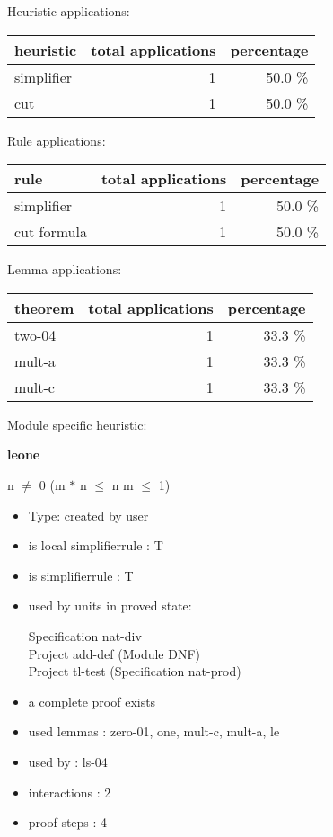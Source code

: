 \documentclass[a4paper]{article}
\begin{document}
\medskip


Heuristic applications:

\begin{supertabular}{l|r|r}
heuristic	& total applications & percentage \\ \hline
simplifier & 1 & 50.0 \% \\
cut & 1 & 50.0 \% \\

\end{supertabular}

Rule applications:

\begin{supertabular}{l|r|r}
rule	        & total applications & percentage \\ \hline
simplifier & 1 & 50.0 \% \\
cut formula & 1 & 50.0 \% \\

\end{supertabular}

Lemma applications:

\begin{supertabular}{l|r|r}
theorem	        & total applications & percentage \\ \hline
two-04 & 1 & 33.3 \% \\
mult-a & 1 & 33.3 \% \\
mult-c & 1 & 33.3 \% \\

\end{supertabular}

Module specific heuristic:

\pagebreak

{\LARGE\bf leone}\label{lemma-leone}

\medskip

 \Fol n $\neq$ 0 \Imp (m $*$ n $\le$ n \Equiv m $\le$ 1)

\begin{itemize}

\item Type: created by user

\item is local simplifierrule : T
\item is simplifierrule : T
\item used by units in proved state:

Specification nat-div \\
Project add-def (Module DNF) \\
Project tl-test (Specification nat-prod)
\item       a complete proof exists
\item       used lemmas  : zero-01, one, mult-c, mult-a, le
\item       used by      : ls-04
\item       interactions : 2
\item       proof steps  : 4
\end{itemize}
\end{document}
